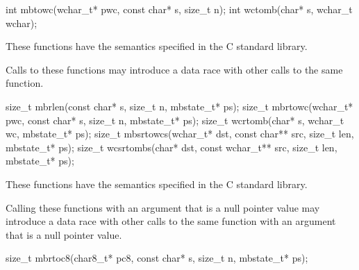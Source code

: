 %
%
\begin{itemdecl}
int mbtowc(wchar_t* pwc, const char* s, size_t n);
int wctomb(char* s, wchar_t wchar);
\end{itemdecl}

\begin{itemdescr}
\pnum
\effects
These functions have the semantics specified in the C standard library.

\pnum
\remarks
Calls to these functions
may introduce a data race
with other calls to the same function.
\end{itemdescr}


%
%
%
%
%
\begin{itemdecl}
size_t mbrlen(const char* s, size_t n, mbstate_t* ps);
size_t mbrtowc(wchar_t* pwc, const char* s, size_t n, mbstate_t* ps);
size_t wcrtomb(char* s, wchar_t wc, mbstate_t* ps);
size_t mbsrtowcs(wchar_t* dst, const char** src, size_t len, mbstate_t* ps);
size_t wcsrtombs(char* dst, const wchar_t** src, size_t len, mbstate_t* ps);
\end{itemdecl}

\begin{itemdescr}
\pnum
\effects
These functions have the semantics specified in the C standard library.

\pnum
\remarks
Calling these functions
with an  argument that is a null pointer value
may introduce a data race
with other calls to the same function
with an  argument that is a null pointer value.
\end{itemdescr}


%
\begin{itemdecl}
size_t mbrtoc8(char8_t* pc8, const char* s, size_t n, mbstate_t* ps);
\end{itemdecl}

